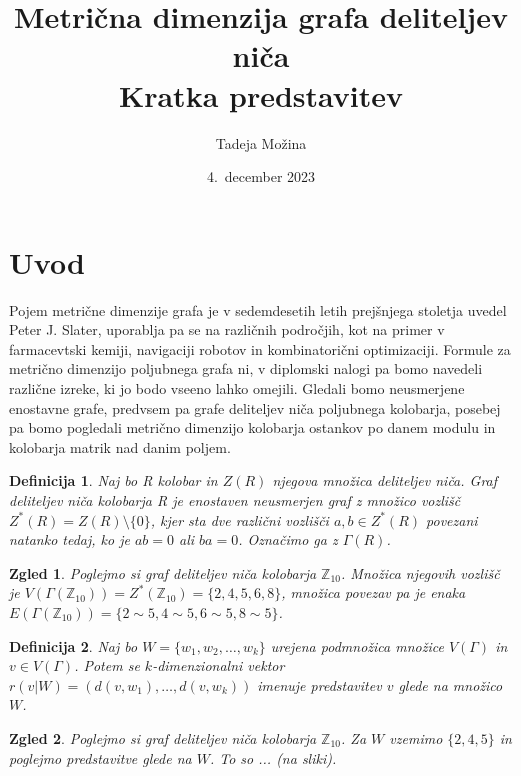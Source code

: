 \documentclass[a4paper,12pt]{article}
\title{Metrična dimenzija grafa deliteljev niča \\ 
\Large Kratka predstavitev}
\author{Tadeja Možina}
\date{4.\ december 2023}
\def\Z{\mathbb{Z}} %
\newtheorem{definicija}{Definicija}
\newtheorem{zgled}{Zgled}
\begin{document}


\maketitle


\section{Uvod}
Pojem metrične dimenzije grafa je v sedemdesetih letih prejšnjega stoletja 
uvedel Peter J. Slater, uporablja pa se 
na različnih področjih, kot na primer v farmacevtski kemiji, navigaciji 
robotov in kombinatorični optimizaciji. 
Formule za metrično dimenzijo 
poljubnega grafa ni, v diplomski nalogi pa bomo navedeli 
različne izreke, ki jo bodo vseeno lahko omejili. Gledali bomo neusmerjene 
enostavne grafe, predvsem pa grafe deliteljev niča poljubnega kolobarja, 
posebej pa bomo pogledali metrično dimenzijo kolobarja ostankov po danem modulu 
in kolobarja matrik nad danim poljem.
%
\begin{definicija}
    Naj bo R kolobar in $Z(R)$ njegova množica deliteljev niča.
    \emph{Graf deliteljev niča kolobarja R} je enostaven neusmerjen graf z množico
    vozlišč $Z^{*}(R) = Z(R)\setminus\{0\} $, kjer sta dve različni vozlišči $a,b \in Z^{*}(R) $
    povezani natanko tedaj, ko je $ab = 0$ ali $ba = 0$. Označimo ga z $\Gamma(R)$.
\end{definicija}
%
\begin{zgled}
    Poglejmo si graf deliteljev niča kolobarja $\Z_{10}$. Množica njegovih vozlišč je 
    $V(\Gamma(\Z_{10})) = Z^{*}(\Z_{10}) = \{2, 4, 5, 6, 8\}$, množica povezav pa 
    je enaka $E(\Gamma(\Z_{10})) = \{2 \sim 5, 4 \sim 5, 6 \sim 5, 8 \sim 5\}$.
\end{zgled}
%
\begin{definicija}
    Naj bo $W = \{ w_1,w_2, \ldots, w_k \}$ urejena podmnožica množice $V(\Gamma)$ in 
    $v \in V(\Gamma)$. Potem 
    se $k$-dimenzionalni vektor \\
    $r(v|W)=( d(v,w_1), \ldots, d(v,w_k) )$ imenuje 
    \emph{predstavitev $v$ glede na množico $W$}. 

\end{definicija}
%
\begin{zgled}\label{prim1}
    Poglejmo si graf deliteljev niča kolobarja $\Z_{10}$. Za $W$ vzemimo 
    $\{2,4,5\}$ in poglejmo predstavitve glede na $W$. To so ... (na sliki).
\end{zgled}
\end{document}
